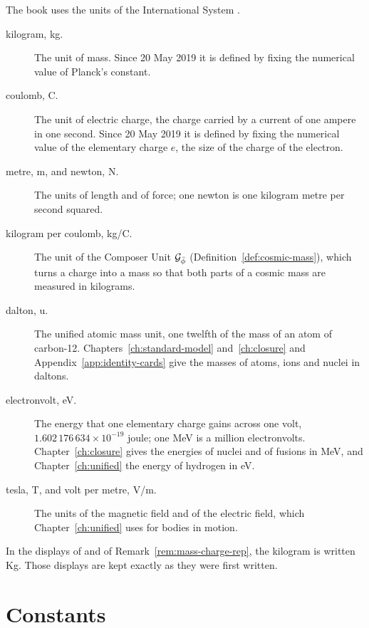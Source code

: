 The book uses the units of the International System \citep{BIPM2019}.
\begin{description}
  \item[kilogram, kg.] The unit of mass. Since 20 May 2019 it is defined by fixing the numerical value of Planck's constant.
  \item[coulomb, C.] The unit of electric charge, the charge carried by a current of one ampere in one second. Since 20 May 2019 it is defined by fixing the numerical value of the elementary charge $e$, the size of the charge of the electron.
  \item[metre, m, and newton, N.] The units of length and of force; one newton is one kilogram metre per second squared.
  \item[kilogram per coulomb, kg/C.] The unit of the Composer Unit $\mathcal{G}_{\bar{\phi}}$ (Definition~\ref{def:cosmic-mass}), which turns a charge into a mass so that both parts of a cosmic mass are measured in kilograms.
  \item[dalton, u.] The unified atomic mass unit, one twelfth of the mass of an atom of carbon-12. Chapters~\ref{ch:standard-model} and~\ref{ch:closure} and Appendix~\ref{app:identity-cards} give the masses of atoms, ions and nuclei in daltons.
  \item[electronvolt, eV.] The energy that one elementary charge gains across one volt, $1.602\,176\,634 \times 10^{-19}$ joule; one MeV is a million electronvolts. Chapter~\ref{ch:closure} gives the energies of nuclei and of fusions in MeV, and Chapter~\ref{ch:unified} the energy of hydrogen in eV.
  \item[tesla, T, and volt per metre, V/m.] The units of the magnetic field and of the electric field, which Chapter~\ref{ch:unified} uses for bodies in motion.
\end{description}
In the displays of  and of Remark~\ref{rem:mass-charge-rep}, the kilogram is written Kg. Those displays are kept exactly as they were first written.

\section{Constants}\label{app:constants}

